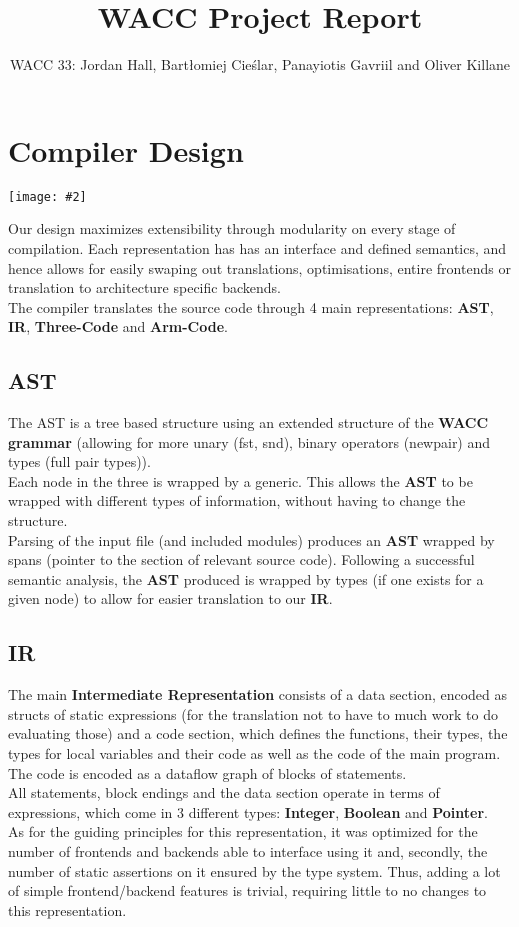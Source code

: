 \documentclass{article}
\title{\vspace*{-1cm}WACC Project Report}
\author{WACC 33: Jordan Hall, Bartłomiej Cieślar, Panayiotis Gavriil and Oliver Killane}
\date{\vspace*{-1cm}}
\newcommand{\centerimage}[2]{\begin{center}
    \texttt{[image: \#2]}
\end{center}}
\newcommand{\keyword}[1]{\textbf{#1}}
\begin{document}
    \maketitle

    \section*{Compiler Design}
        \centerimage{0.8}{Compiler Map}
        Our design maximizes extensibility through modularity on every stage 
        of compilation. Each representation has has an interface and defined semantics, 
        and hence allows for easily swaping out translations, optimisations, entire frontends or 
        translation to architecture specific backends.
        \\ The compiler translates the source code through 4 main representations:  \keyword{AST}, \keyword{IR}, \keyword{Three-Code} and \keyword{Arm-Code}.

        \subsection*{AST}
            The AST is a tree based structure using an extended structure of the \keyword{WACC grammar} 
            (allowing for more unary (fst, snd), binary operators (newpair) and types (full 
            pair types)).
            \\ Each node in the three is wrapped by a generic. This allows the \keyword{AST} to be wrapped with different types of information, without having to change the structure.
            \\ Parsing of the input file (and included modules) produces an \keyword{AST} wrapped by spans (pointer to the section of relevant source code). Following a successful semantic analysis, the \keyword{AST} produced is wrapped by types (if one exists for a given node) to allow for easier translation to our \keyword{IR}.
        
        \subsection*{IR}
            The main \keyword{Intermediate Representation} consists of a data section, encoded as structs of static expressions (for the translation not to have to much work to do evaluating those) and a code section, which defines the functions, their types, the types for local variables and their code as well as the code of the main program.
            \\ The code is encoded as a dataflow graph of blocks of statements.
            \\ All statements, block endings and the data section operate in terms of expressions, which come in 3 different types: \keyword{Integer}, \keyword{Boolean} and \keyword{Pointer}.
            \\ As for the guiding principles for this representation, it was optimized for the number of frontends and backends able to interface using it and, secondly, the number of static assertions on it ensured by the type system. Thus, adding a lot of simple frontend/backend features is trivial, requiring little to no changes to this representation.
        
\end{document}
